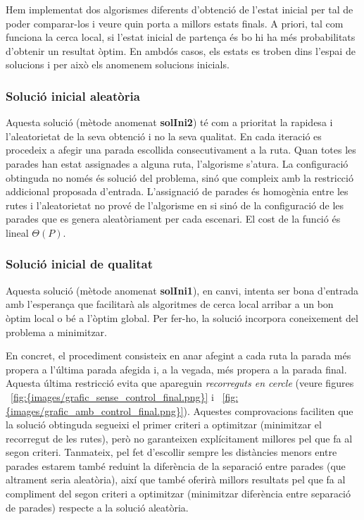 
Hem implementat dos algorismes diferents d'obtenció de l'estat inicial per tal de poder comparar-los i veure quin porta a millors estats finals. A priori, tal com funciona la cerca local, si l'estat inicial de partença és bo hi ha més probabilitats d'obtenir un resultat òptim.  En ambdós casos, els estats es troben dins l'espai de solucions i per això els anomenem solucions inicials.

\subsubsection{Solució inicial aleatòria}

Aquesta solució (mètode anomenat \textbf{solIni2}) té com a prioritat la rapidesa i l'aleatorietat de la seva obtenció i no la seva qualitat. En cada iteració es procedeix a afegir una parada escollida consecutivament a la ruta. Quan totes les parades han estat assignades a alguna ruta, l'algorisme s'atura. La configuració obtinguda no només és solució del problema, sinó que compleix amb la restricció addicional proposada d'entrada. L'assignació de parades és homogènia entre les rutes i l'aleatorietat no prové de l'algorisme en si sinó de la configuració de les parades que es genera aleatòriament per cada escenari. El cost de la funció és lineal $\Theta(P)$.

\subsubsection{Solució inicial de qualitat}

Aquesta solució (mètode anomenat \textbf{solIni1}), en canvi, intenta ser bona d'entrada amb l'esperança que facilitarà als algoritmes de cerca local arribar a un bon òptim local o bé a l'òptim global. Per fer-ho, la solució incorpora coneixement del problema a minimitzar. 

En concret, el procediment consisteix en anar afegint a cada ruta la parada més propera a l'última parada afegida i, a la vegada, més propera a la parada final. Aquesta última restricció evita que apareguin \emph{recorreguts en cercle} (veure figures ~\ref{fig:{images/grafic_sense_control_final.png}} i ~\ref{fig:{images/grafic_amb_control_final.png}}). Aquestes comprovacions faciliten que la solució obtinguda segueixi el primer criteri a optimitzar (minimitzar el recorregut de les rutes), però no garanteixen explícitament millores pel que fa al segon criteri. Tanmateix, pel fet d'escollir sempre les distàncies menors entre parades estarem també reduint la diferència de la separació entre parades (que altrament seria aleatòria), així que també oferirà millors resultats pel que fa al compliment del segon criteri a optimitzar (minimitzar diferència entre separació de parades) respecte a la solució aleatòria.

